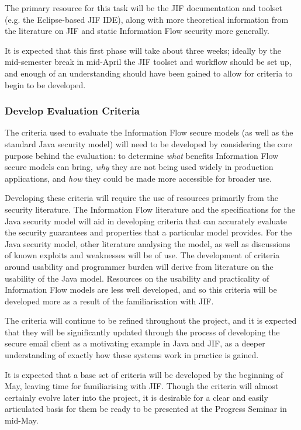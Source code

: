 The primary resource for this task will be the JIF documentation and toolset (e.g. the Eclipse-based JIF IDE), along with more theoretical information from the literature on JIF and static Information Flow security more generally.

It is expected that this first phase will take about three weeks; ideally by the mid-semester break in mid-April the JIF toolset and workflow should be set up, and enough of an understanding should have been gained to allow for criteria to begin to be developed.

\subsubsection{Develop Evaluation Criteria}

The criteria used to evaluate the Information Flow secure models (as well as the standard Java security model) will need to be developed by considering the core purpose behind the evaluation: to determine \textit{what} benefits Information Flow secure models can bring, \textit{why} they are not being used widely in production applications, and \textit{how} they could be made more accessible for broader use.

Developing these criteria will require the use of resources primarily from the security literature. The Information Flow literature and the specifications for the Java security model will aid in developing criteria that can accurately evaluate the security guarantees and properties that a particular model provides. For the Java security model, other literature analysing the model, as well as discussions of known exploits and weaknesses will be of use. The development of criteria around usability and programmer burden will derive from literature on the usability of the Java model. Resources on the usability and practicality of Information Flow models are less well developed, and so this criteria will be developed more as a result of the familiarisation with JIF.

The criteria will continue to be refined throughout the project, and it is expected that they will be significantly updated through the process of developing the secure email client as a motivating example in Java and JIF, as a deeper understanding of exactly how these systems work in practice is gained.

It is expected that a base set of criteria will be developed by the beginning of May, leaving time for familiarising with JIF. Though the criteria will almost certainly evolve later into the project, it is desirable for a clear and easily articulated basis for them be ready to be presented at the Progress Seminar in mid-May.

